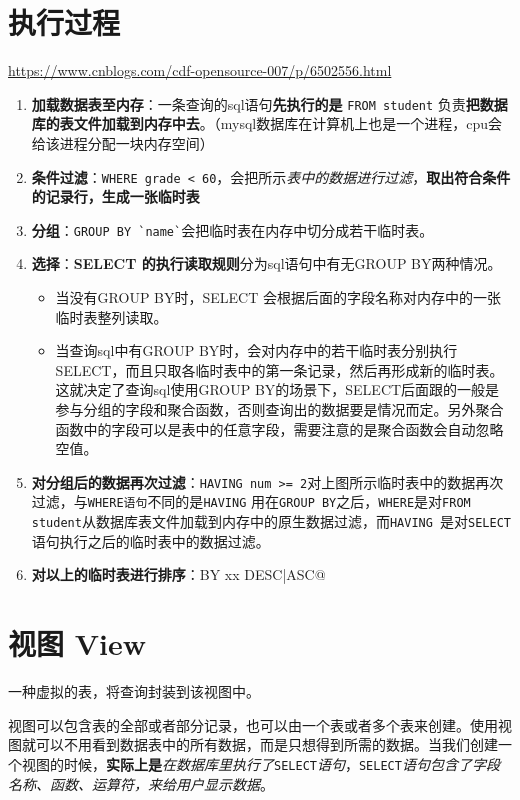 \documentclass[UTF8,a4paper,12pt]{ctexbook}
\begin{document}
	\section{执行过程}
		\url{https://www.cnblogs.com/cdf-opensource-007/p/6502556.html}
		
		\begin{enumerate}
			\item \textbf{加载数据表至内存}：一条查询的sql语句\textbf{先执行的是} \verb|FROM student| 负责\textbf{把数据库的表文件加载到内存中去}。（mysql数据库在计算机上也是一个进程，cpu会给该进程分配一块内存空间）
			\item \textbf{条件过滤}：\verb|WHERE grade < 60|，会把所示\textit{表中的数据进行过滤}，\textbf{取出符合条件的记录行，生成一张临时表}
			\item \textbf{分组}：\verb|GROUP BY `name`|会把临时表在内存中切分成若干临时表。
			\item \textbf{选择}：\textbf{SELECT 的执行读取规则}分为sql语句中有无GROUP BY两种情况。
				\begin{itemize}
					\item 当没有GROUP BY时，SELECT 会根据后面的字段名称对内存中的一张临时表整列读取。
					\item 当查询sql中有GROUP BY时，会对内存中的若干临时表分别执行SELECT，而且只取各临时表中的第一条记录，然后再形成新的临时表。这就决定了查询sql使用GROUP BY的场景下，SELECT后面跟的一般是参与分组的字段和聚合函数，否则查询出的数据要是情况而定。另外聚合函数中的字段可以是表中的任意字段，需要注意的是聚合函数会自动忽略空值。
				\end{itemize}
			\item \textbf{对分组后的数据再次过滤}：\verb|HAVING num >= 2|对上图所示临时表中的数据再次过滤，与\verb|WHERE语句|不同的是\verb|HAVING| 用在\verb|GROUP BY|之后，\verb|WHERE|是对\verb|FROM student|从数据库表文件加载到内存中的原生数据过滤，而\verb|HAVING |是对\verb|SELECT |语句执行之后的临时表中的数据过滤。
			\item \textbf{对以上的临时表进行排序}：\verb@ORDER BY xx DESC|ASC@
		\end{enumerate}
		
	
	
	\section{视图 View}
		一种虚拟的表，将查询封装到该视图中。
		
		视图可以包含表的全部或者部分记录，也可以由一个表或者多个表来创建。使用视图就可以不用看到数据表中的所有数据，而是只想得到所需的数据。当我们创建一个视图的时候，\textbf{实际上是}\textit{在数据库里执行了}\verb|SELECT|\textit{语句}，\verb|SELECT|\textit{语句包含了字段名称、函数、运算符，来给用户显示数据}。
		
\end{document}
